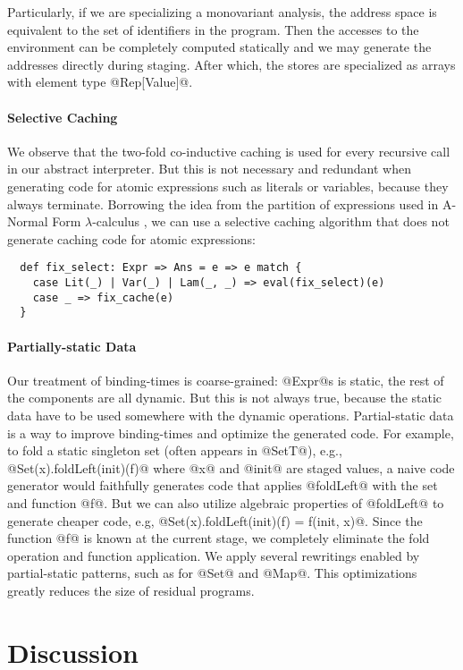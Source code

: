 Particularly, if we are specializing a monovariant analysis, the address space
is equivalent to the set of identifiers in the program. Then the accesses to
the environment can be completely computed statically and we may generate the
addresses directly during staging. After which, the stores are specialized
as arrays with element type @Rep[Value]@.

\paragraph{Selective Caching} We observe that the two-fold co-inductive
caching is used for every recursive call in our abstract interpreter. But this
is not necessary and redundant when generating code for atomic
expressions such as literals or variables, because they always terminate.
Borrowing the idea from the partition of expressions used in A-Normal Form
$\lambda$-calculus \cite{Flanagan:1993:ECC:155090.155113}, we can use a
selective caching algorithm that does not generate caching code for atomic
expressions:
\begin{lstlisting}
  def fix_select: Expr => Ans = e => e match {
    case Lit(_) | Var(_) | Lam(_, _) => eval(fix_select)(e)
    case _ => fix_cache(e)
  }
\end{lstlisting}

\paragraph{Partially-static Data}
Our treatment of binding-times is coarse-grained: @Expr@s is static, the rest
of the components are all dynamic. But this is not always true, because the
static data have to be used somewhere with the dynamic operations.
Partial-static data is a way to improve binding-times and optimize the
generated code.
For example, to fold a static singleton set (often appears in @SetT@), e.g.,
@Set(x).foldLeft(init)(f)@ where @x@ and @init@ are staged values, a naive code
generator would faithfully generates code that applies @foldLeft@ with the set
and function @f@. But we can also utilize algebraic properties of @foldLeft@
to generate cheaper code, e.g, @Set(x).foldLeft(init)(f) = f(init, x)@. Since the
function @f@ is known at the current stage, we completely eliminate the fold
operation and function application. We apply several rewritings enabled by
partial-static patterns, such as for @Set@ and @Map@. This optimizations
greatly reduces the size of residual programs.

\section{Discussion} \label{discussion}

